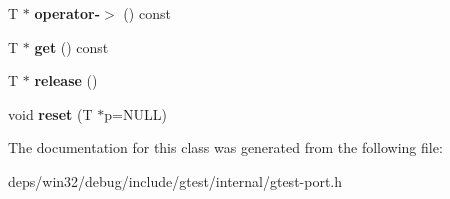 \begin{DoxyCompactItemize}
\item 
\hypertarget{classtesting_1_1internal_1_1scoped__ptr_adc38310fbbe400faf9279e36000a17c4}{}T $\ast$ {\bfseries operator-\/$>$} () const \label{classtesting_1_1internal_1_1scoped__ptr_adc38310fbbe400faf9279e36000a17c4}

\item 
\hypertarget{classtesting_1_1internal_1_1scoped__ptr_adc8f8fcb63ce69f80f011456e6d2f08d}{}T $\ast$ {\bfseries get} () const \label{classtesting_1_1internal_1_1scoped__ptr_adc8f8fcb63ce69f80f011456e6d2f08d}

\item 
\hypertarget{classtesting_1_1internal_1_1scoped__ptr_a7a4f3e568d81a5d8bcb5f8d6bf5130b1}{}T $\ast$ {\bfseries release} ()\label{classtesting_1_1internal_1_1scoped__ptr_a7a4f3e568d81a5d8bcb5f8d6bf5130b1}

\item 
\hypertarget{classtesting_1_1internal_1_1scoped__ptr_acac03266a43359801aff0de5c990bec0}{}void {\bfseries reset} (T $\ast$p=N\+U\+L\+L)\label{classtesting_1_1internal_1_1scoped__ptr_acac03266a43359801aff0de5c990bec0}

\end{DoxyCompactItemize}


The documentation for this class was generated from the following file\+:\begin{DoxyCompactItemize}
\item 
deps/win32/debug/include/gtest/internal/gtest-\/port.\+h\end{DoxyCompactItemize}

